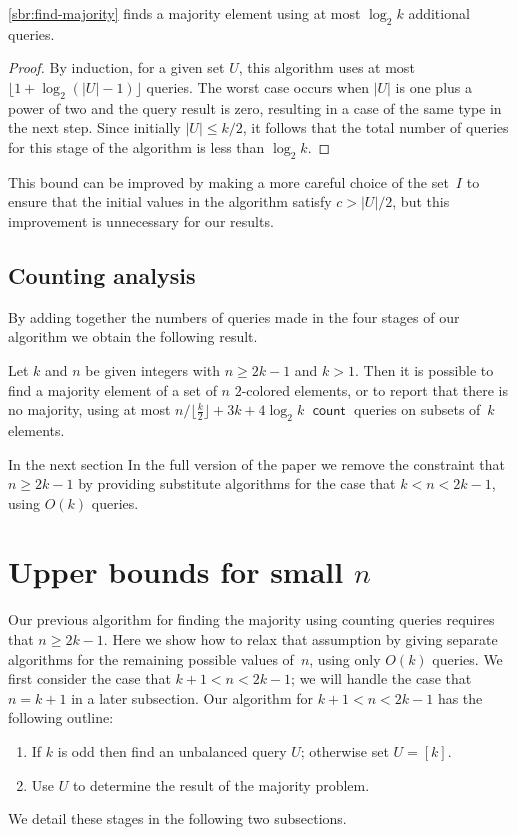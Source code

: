 \documentclass[11pt]{llncs}
\newcommand{\qcount}{\operatorname{\mathsf{count}}}
\begin{document}
\ifFull
\begin{lemma}
\autoref{sbr:find-majority} finds a majority element using at most $\log_2 k$ additional queries.
\end{lemma}
\begin{proof}
\fi
By induction, for a given set $U$, this algorithm uses at most $\lfloor 1+\log_2(|U|-1)\rfloor$ queries. The worst case occurs when $|U|$ is one plus a power of two and the query result is zero, resulting in a case of the same type in the next step. Since initially $|U|\le k/2$, it follows that the total number of queries for this stage of the algorithm is less than $\log_2 k$.
\ifFull
\end{proof}
\fi
This bound can be improved by making a more careful choice of the set~$I$ to ensure that the initial values in the algorithm satisfy $c>|U|/2$, but this improvement is unnecessary for our results.

\subsection{Counting analysis}

By adding together the numbers of queries made in the four stages of our algorithm we obtain the following result.

\begin{theorem}
Let $k$ and $n$ be given integers with $n\ge 2k-1$ and $k>1$. Then it is possible to find a majority element of a set of $n$ $2$-colored elements, or to report that there is no majority, using at most $n/\lfloor\tfrac{k}{2}\rfloor+3k+4\log_2 k$ $\qcount$ queries on subsets of~$k$ elements.
\end{theorem}

\ifFull
In the next section
\else
In the full version of the paper
\fi
we remove the constraint that $n\ge 2k-1$ by providing substitute algorithms for the case that $k<n<2k-1$, using $O(k)$ queries.

\ifFull
\section{Upper bounds for small $n$}

Our previous algorithm for finding the majority using counting queries requires that $n\ge 2k-1$.
Here we show how to relax that assumption by giving separate algorithms for the remaining possible values of~$n$, using only $O(k)$ queries. We first consider the case that $k+1<n<2k-1$; we will handle the case that $n=k+1$ in a later subsection.
Our  algorithm for $k+1<n<2k-1$ has the following outline:
\begin{enumerate}
\item If $k$ is odd then find an unbalanced query $U$; otherwise set $U = [k]$.
\item Use $U$ to determine the result of the majority problem.
\end{enumerate}
We detail these stages in the following two subsections.
\end{document}

